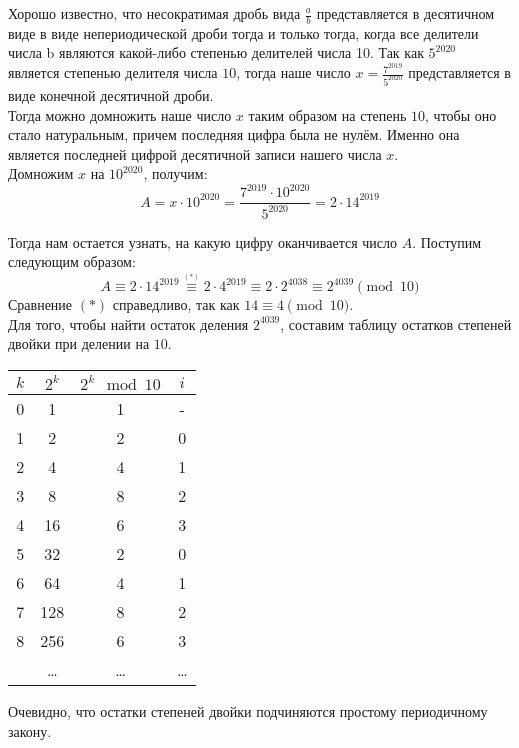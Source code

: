  {
    Хорошо известно, что несократимая дробь вида $\displaystyle \frac ab$ представляется в десятичном виде в виде непериодической дроби тогда и только тогда, когда все делители числа b являются какой-либо степенью делителей числа 10. Так как $5^{2020}$ является степенью делителя числа $10$, тогда наше число $\displaystyle x = \frac{7^{2019}}{5^{2020}}$ представляется в виде конечной десятичной дроби.\\[5mm]
    
    Тогда можно домножить наше число $x$ таким образом на степень $10$, чтобы оно стало натуральным, причем последняя цифра была не нулём. Именно она является последней цифрой десятичной записи нашего числа $x$.\\[5mm]
    
    Домножим $x$ на $10^{2020}$, получим:
    $$ A = x \cdot 10 ^ {2020} = \frac{7 ^ {2019} \cdot 10 ^ {2020}}{5 ^ {2020}} = 2 \cdot 14 ^ {2019} $$
    
    Тогда нам остается узнать, на какую цифру оканчивается число $A$. Поступим следующим образом:
    \begin{equation}
        A \equiv 2  \cdot 14^{2019} \stackrel{^{(*)}}{\equiv} 2 \cdot 4^{2019} \equiv 2 \cdot 2 ^ {4038} \equiv 2^{4039} \pmod{10}
    \end{equation}
    Сравнение $(*)$ справедливо, так как $ 14 \equiv 4 \pmod{10} $.\\[2mm]
    
    Для того, чтобы найти остаток деления $\displaystyle 2^{4039}$, составим таблицу остатков степеней двойки при делении на $10$.\\
    \begin{center} \begin{tabular}{ |c|c|c|c| } 
        \hline
        $k$ & $2^k$ & $2^k \mod 10$ & $i$ \\ \hline
        0 & 1 & 1   & - \\     \hline
        1 & 2 & 2   & 0 \\
        2 & 4 & 4   & 1 \\ 
        3 & 8 & 8   & 2 \\ 
        4 & 16 & 6  & 3 \\    \hline
        5 & 32 & 2  & 0 \\
        6 & 64 & 4  & 1 \\ 
        7 & 128 & 8 & 2\\
        8 & 256 & 6 & 3 \\   \hline
        & \ldots & \ldots &  \ldots \\   \hline
    \end{tabular} \end{center}
    Очевидно, что остатки степеней двойки подчиняются простому периодичному закону.\\
    
}
